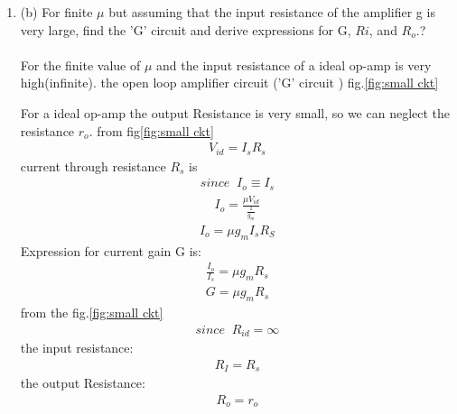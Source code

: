 \begin{enumerate}[label=\thesection.\arabic*.,ref=\thesection.\theenumi]
\item
\label{Question_1b_ee18btech11023}
(b) For finite $\mu$ but assuming that the input resistance of the
amplifier g is very large, find the 'G' circuit and derive
expressions for G, $Ri$, and $R_o$.?
\\
\solution\\
For the finite value of $\mu$ and the input resistance of a ideal op-amp is very high(infinite).
the open loop amplifier circuit ('G' circuit ) fig.\ref{fig:small ckt}
\begin{figure}[!ht]
	\begin{center}
			\resizebox{\columnwidth}{!}{}
	\end{center}
\caption{}
\label{fig:Original ckt1}
\end{figure}

For a ideal op-amp the output Resistance is very small, so we can neglect the resistance $r_o$.  from fig\ref{fig:small ckt}
\begin{align}
    V_{id} = I_sR_s
    \label{eq_ee18btech11023_7}
\end{align}
current through resistance $R_s$ is
\begin{align*}
    since\;\;I_o \equiv I_s
\end{align*}
\begin{align}
    I_o = \frac{\mu V_{id}}{\frac{1}{g_m}} 
    \label{eq_ee18btech11023_8}
\end{align}
\begin{align}
    I_o = \mu g_m I_s R_S
    \label{eq_ee18btech11023_9}
\end{align}
Expression for current gain G is:
\begin{align}
    \frac{I_o}{I_s} = \mu g_m R_s
    \label{eq_ee18btech11023_10}
\end{align}
\begin{align}
    G = \mu g_m R_s
    \label{eq_ee18btech11023_11}
\end{align}
from the fig.\ref{fig:small ckt}
\begin{align*}
    since \;\; R_{id} = \infty
\end{align*}
the input resistance:
\begin{align}
    R_I = R_s
    \label{eq_ee18btech11023_12}
\end{align}
the output Resistance:
\begin{align}
    R_o = r_o
    \label{eq_ee18btech11023_13}
\end{align}


\end{enumerate}
